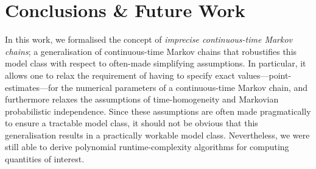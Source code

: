 \documentclass[10pt,a4paper]{paper}
\theoremstyle{definition}
\newcommand{\states}{\mathcal{X}}
\newcommand{\gambles}{\mathcal{L}}
\newcommand{\gamblesX}{\gambles(\states)}
\begin{document}





\section{Conclusions \& Future Work}\label{sec:conclusions}

In this work, we formalised the concept of \emph{imprecise continuous-time Markov chains}; a generalisation of continuous-time Markov chains that robustifies this model class with respect to often-made simplifying assumptions. 
%
In particular, it allows one to relax the requirement of having to specify exact values---point-estimates---for the numerical parameters of a continuous-time Markov chain, and furthermore relaxes the assumptions of time-homogeneity and Markovian probabilistic independence. Since these assumptions are often made pragmatically to ensure a tractable model class, it should not be obvious that this generalisation results in a practically workable model class. Nevertheless, we were still able to derive polynomial runtime-complexity algorithms for computing quantities of interest.
\end{document}
